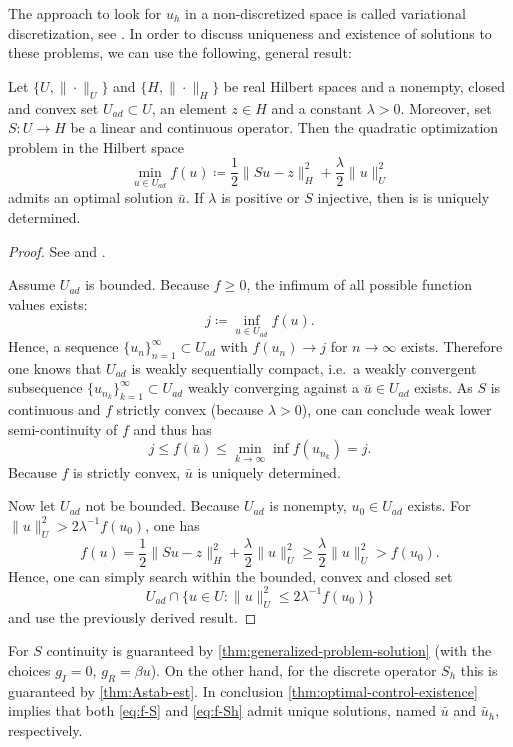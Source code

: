 \documentclass[../thesis.tex]{subfiles}
\begin{document}
The approach to look for $u_h$ in a non-discretized space is called variational discretization, see \cite{Hinze}.
In order to discuss uniqueness and existence of solutions to these problems, we can use the following, general result:
\begin{theorem}
\label{thm:optimal-control-existence}
Let $\{ U, \| \cdot \|_U \}$ and $\{ H, \| \cdot \|_H \}$ be real Hilbert spaces and a nonempty, closed and convex set $U_{ad} \subset U$, an element $z \in H$ and a constant $\lambda > 0$.
Moreover, set $S : U \to H$ be a linear and continuous operator.
Then the quadratic optimization problem in the Hilbert space
\[
	\min_{u \in U_{ad}} f(u) \coloneqq \frac{1}{2} \| Su - z \|_H^2 + \frac{\lambda}{2} \| u \|_U^2
\]
admits an optimal solution $\bar{u}$. If $\lambda$ is positive or $S$ injective, then is is uniquely determined.
\end{theorem}
\begin{proof}
See \cite[Satz 2.14]{Troeltzsch} and \cite[Satz 2.15]{Troeltzsch}.

Assume $U_{ad}$ is bounded. Because $f \geq 0$, the infimum of all possible function values exists:
\[
	j \coloneqq \inf_{u \in U_{ad}} f(u).
\]
Hence, a sequence $\{ u_n \}_{n=1}^\infty \subset U_{ad}$ with $f(u_n) \to j$ for $n \to \infty$ exists.
Therefore one knows that $U_{ad}$ is weakly sequentially compact, i.e.\ a weakly convergent subsequence $\{ u_{n_k} \}_{k=1}^\infty \subset U_{ad}$ weakly converging against a $\bar{u} \in U_{ad}$ exists.
As $S$ is continuous and $f$ strictly convex (because $\lambda > 0$), one can conclude weak lower semi-continuity of $f$ and thus has
\[
	j \leq f(\bar{u}) \leq \min_{k \to \infty} \inf f(u_{n_k}) = j.
\]
Because $f$ is strictly convex, $\bar{u}$ is uniquely determined.

Now let $U_{ad}$ not be bounded. Because $U_{ad}$ is nonempty, $u_0 \in U_{ad}$ exists. For $\| u \|_U^2 > 2 \lambda^{-1} f(u_0)$, one has
\[
	f(u) = \frac{1}{2} \| S u - z \|_H^2 + \frac{\lambda}{2} \| u \|_U^2 \geq \frac{\lambda}{2} \| u \|_U^2 > f(u_0).
\]
Hence, one can simply search within the bounded, convex and closed set
\[
	U_{ad} \cap \{ u \in U : \| u \|_U^2 \leq 2 \lambda^{-1} f(u_0) \}
\]
and use the previously derived result.
\end{proof}
For $S$ continuity is guaranteed by \cref{thm:generalized-problem-solution} (with the choices $g_I = 0$, $g_R = \beta u$).
On the other hand, for the discrete operator $S_h$ this is guaranteed by \cref{thm:Astab-est}.
In conclusion \cref{thm:optimal-control-existence} implies that both \cref{eq:f-S} and \cref{eq:f-Sh} admit unique solutions, named $\bar{u}$ and $\bar{u}_h$, respectively.
\end{document}
